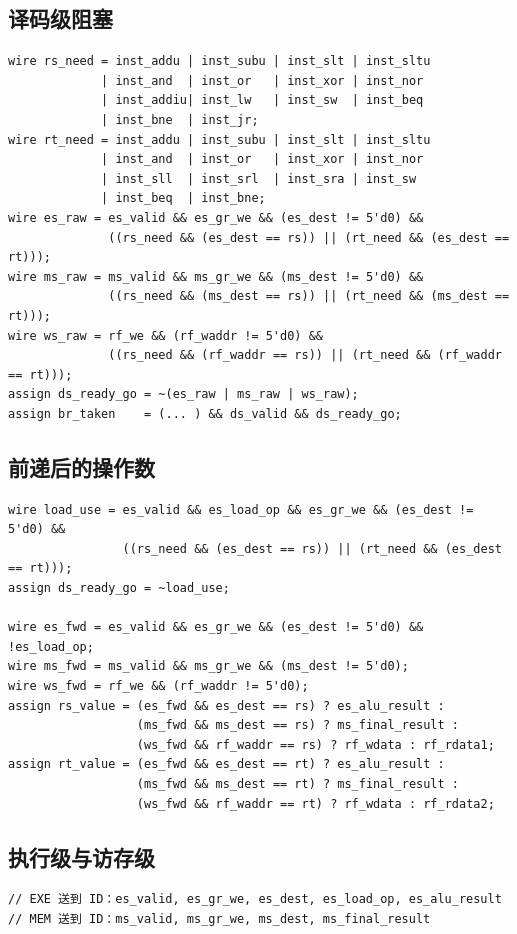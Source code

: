 \documentclass{article}
\begin{document}
\subsection{译码级阻塞}
\begin{verbatim}
wire rs_need = inst_addu | inst_subu | inst_slt | inst_sltu
             | inst_and  | inst_or   | inst_xor | inst_nor
             | inst_addiu| inst_lw   | inst_sw  | inst_beq
             | inst_bne  | inst_jr;
wire rt_need = inst_addu | inst_subu | inst_slt | inst_sltu
             | inst_and  | inst_or   | inst_xor | inst_nor
             | inst_sll  | inst_srl  | inst_sra | inst_sw
             | inst_beq  | inst_bne;
wire es_raw = es_valid && es_gr_we && (es_dest != 5'd0) &&
              ((rs_need && (es_dest == rs)) || (rt_need && (es_dest == rt)));
wire ms_raw = ms_valid && ms_gr_we && (ms_dest != 5'd0) &&
              ((rs_need && (ms_dest == rs)) || (rt_need && (ms_dest == rt)));
wire ws_raw = rf_we && (rf_waddr != 5'd0) &&
              ((rs_need && (rf_waddr == rs)) || (rt_need && (rf_waddr == rt)));
assign ds_ready_go = ~(es_raw | ms_raw | ws_raw);
assign br_taken    = (... ) && ds_valid && ds_ready_go;
\end{verbatim}

\subsection{前递后的操作数}
\begin{verbatim}
wire load_use = es_valid && es_load_op && es_gr_we && (es_dest != 5'd0) &&
                ((rs_need && (es_dest == rs)) || (rt_need && (es_dest == rt)));
assign ds_ready_go = ~load_use;

wire es_fwd = es_valid && es_gr_we && (es_dest != 5'd0) && !es_load_op;
wire ms_fwd = ms_valid && ms_gr_we && (ms_dest != 5'd0);
wire ws_fwd = rf_we && (rf_waddr != 5'd0);
assign rs_value = (es_fwd && es_dest == rs) ? es_alu_result :
                  (ms_fwd && ms_dest == rs) ? ms_final_result :
                  (ws_fwd && rf_waddr == rs) ? rf_wdata : rf_rdata1;
assign rt_value = (es_fwd && es_dest == rt) ? es_alu_result :
                  (ms_fwd && ms_dest == rt) ? ms_final_result :
                  (ws_fwd && rf_waddr == rt) ? rf_wdata : rf_rdata2;
\end{verbatim}

\subsection{执行级与访存级}
\begin{verbatim}
// EXE 送到 ID：es_valid, es_gr_we, es_dest, es_load_op, es_alu_result
// MEM 送到 ID：ms_valid, ms_gr_we, ms_dest, ms_final_result
\end{verbatim}
\end{document}
